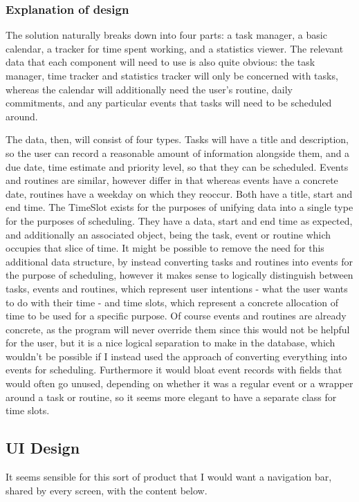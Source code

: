 \documentclass{article}
\begin{document}
\subsubsection{Explanation of design}
The solution naturally breaks down into four parts:
a task manager,
a basic calendar,
a tracker for time spent working,
and a statistics viewer.
The relevant data that each component will need to use is also quite obvious:
the task manager, time tracker and statistics tracker will only be concerned with tasks,
whereas the calendar will additionally need the user's routine, daily commitments,
and any particular events that tasks will need to be scheduled around.

The data, then, will consist of four types.
Tasks will have a title and description,
so the user can record a reasonable amount of information alongside them,
and a due date, time estimate and priority level,
so that they can be scheduled.
Events and routines are similar,
however differ in that whereas events have a concrete date,
routines have a weekday on which they reoccur.
Both have a title, start and end time.
The TimeSlot exists for the purposes of unifying data into a single type for the purposes of scheduling.
They have a data, start and end time as expected,
and additionally an associated object,
being the task, event or routine which occupies that slice of time.
It might be possible to remove the need for this additional data structure,
by instead converting tasks and routines into events for the purpose of scheduling,
however it makes sense to logically distinguish between tasks, events and routines,
which represent user intentions -
what the user wants to do with their time -
and time slots,
which represent a concrete allocation of time to be used for a specific purpose.
Of course events and routines are already concrete,
as the program will never override them since this would not be helpful for the user,
but it is a nice logical separation to make in the database,
which wouldn't be possible if I instead used the approach of converting everything into events for scheduling.
Furthermore it would bloat event records with fields that would often go unused,
depending on whether it was a regular event or a wrapper around a task or routine,
so it seems more elegant to have a separate class for time slots.

\subsection{UI Design}
It seems sensible for this sort of product that I would want a navigation bar,
shared by every screen,
with the content below.
\end{document}
